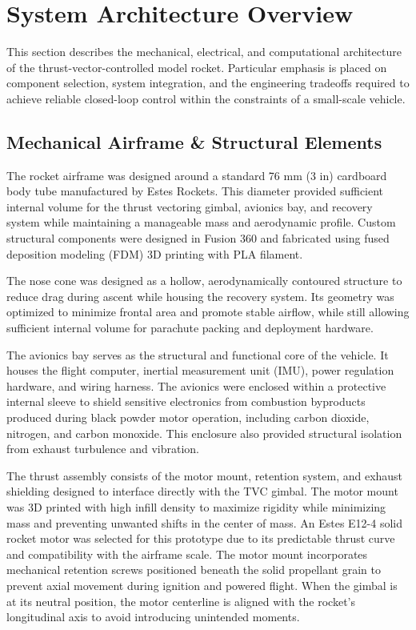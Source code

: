 \section{System Architecture Overview}


This section describes the mechanical, electrical, and computational architecture of the thrust-vector-controlled model rocket. Particular emphasis is placed on component selection, system integration, and the engineering tradeoffs required to achieve reliable closed-loop control within the constraints of a small-scale vehicle.



\subsection{Mechanical Airframe \& Structural Elements}

The rocket airframe was designed around a standard 76 mm (3 in) cardboard body tube manufactured by Estes Rockets. This diameter provided sufficient internal volume for the thrust vectoring gimbal, avionics bay, and recovery system while maintaining a manageable mass and aerodynamic profile. Custom structural components were designed in Fusion 360 and fabricated using fused deposition modeling (FDM) 3D printing with PLA filament.

The nose cone was designed as a hollow, aerodynamically contoured structure to reduce drag during ascent while housing the recovery system. Its geometry was optimized to minimize frontal area and promote stable airflow, while still allowing sufficient internal volume for parachute packing and deployment hardware.

The avionics bay serves as the structural and functional core of the vehicle. It houses the flight computer, inertial measurement unit (IMU), power regulation hardware, and wiring harness. The avionics were enclosed within a protective internal sleeve to shield sensitive electronics from combustion byproducts produced during black powder motor operation, including carbon dioxide, nitrogen, and carbon monoxide. This enclosure also provided structural isolation from exhaust turbulence and vibration.

The thrust assembly consists of the motor mount, retention system, and exhaust shielding designed to interface directly with the TVC gimbal. The motor mount was 3D printed with high infill density to maximize rigidity while minimizing mass and preventing unwanted shifts in the center of mass. An Estes E12-4 solid rocket motor was selected for this prototype due to its predictable thrust curve and compatibility with the airframe scale. The motor mount incorporates mechanical retention screws positioned beneath the solid propellant grain to prevent axial movement during ignition and powered flight. When the gimbal is at its neutral position, the motor centerline is aligned with the rocket’s longitudinal axis to avoid introducing unintended moments.

